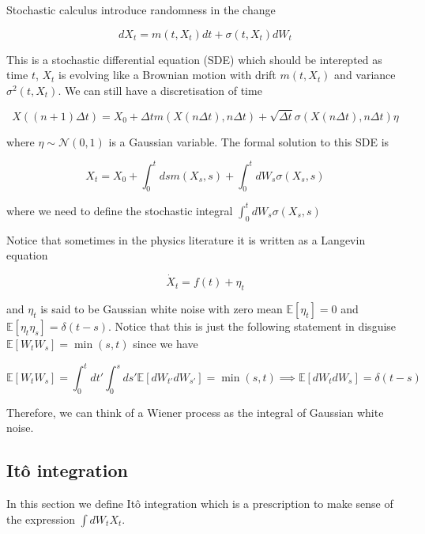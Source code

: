 \documentclass[11pt,a4paper]{article}
\begin{document}
Stochastic calculus introduce randomness in the change

\begin{equation}
    dX_t = m(t,X_t)dt + \sigma(t,X_t)dW_t
\end{equation}

This is a stochastic differential equation (SDE) which should be interepted as time $t$, $X_t$ is evolving like a Brownian motion with drift $m(t, X_t)$ and variance $\sigma^2(t, X_t)$. We can still have a discretisation of time

\begin{equation}
    X((n+1)\Delta t) = X_0 + \Delta t m(X(n \Delta t), n\Delta t) + \sqrt{\Delta t} \sigma(X(n \Delta t), n\Delta t)\eta
\end{equation}

where $\eta \sim \mathcal{N}(0,1)$ is a Gaussian variable. The formal solution to this SDE is

\begin{equation}
    X_t = X_0 + \int_{0}^tds m(X_s,s) + \int_{0}^tdW_s \sigma(X_s,s)
\end{equation}

where we need to define the stochastic integral $\int_{0}^tdW_s \sigma(X_s,s)$


Notice that sometimes in the physics literature it is written as a Langevin equation

\begin{equation}
    \dot{X}_t = f(t) + \eta_t
\end{equation}

and $\eta_t$ is said to be Gaussian white noise with zero mean $\mathbb{E}[\eta_t]=0$ and $\mathbb{E}[\eta_t \eta_s]=\delta(t-s)$. Notice that this is just the following statement in disguise $\mathbb{E}[W_t W_s] = \min(s,t)$ since we have

\begin{equation}
    \mathbb{E}[W_t W_s] = \int_{0}^tdt'\int_{0}^sds'   \mathbb{E}[dW_{t'} dW_{s'}] = \min(s,t) \implies \mathbb{E}[dW_t dW_s] =\delta(t-s) 
\end{equation}

Therefore, we can think of a Wiener process as the integral of Gaussian white noise.


\subsection{It\^{o} integration}

In this section we define It\^{o} integration which is a prescription to make sense of the expression $\int dW_tX_t$.
\end{document}
